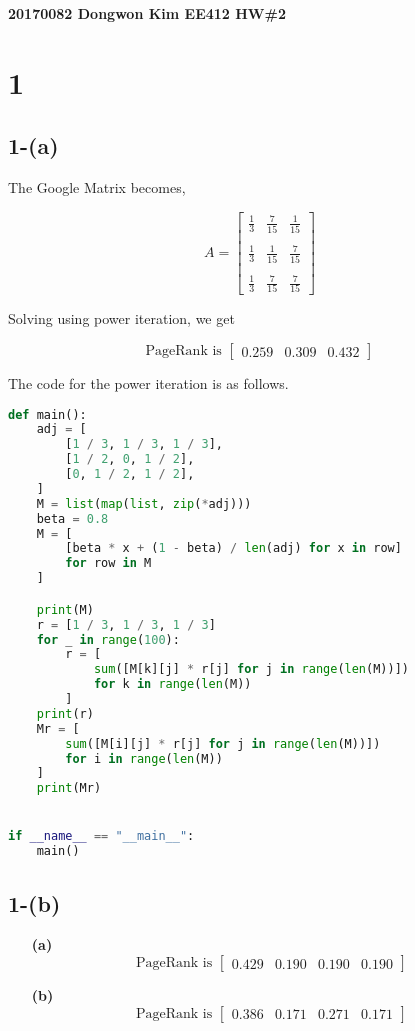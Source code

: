 \documentclass{article}
\begin{document}
\noindent
\textbf{20170082 Dongwon Kim EE412 HW\#2}\\

\noindent
\section*{1}
\subsection*{1-(a)}

The Google Matrix becomes,

\[
A = \begin{bmatrix}
    \frac{1}{3} & \frac{7}{15} & \frac{1}{15} \\ \\
    \frac{1}{3} & \frac{1}{15} & \frac{7}{15} \\ \\
    \frac{1}{3} & \frac{7}{15} & \frac{7}{15}          
\end{bmatrix}
\]

\noindent
Solving using power iteration, we get

\[
\text{PageRank is } \begin{bmatrix} 0.259 & 0.309 & 0.432 \end{bmatrix}
\]

\noindent
The code for the power iteration is as follows.

\begin{lstlisting}[language=Python]
def main():
    adj = [
        [1 / 3, 1 / 3, 1 / 3],
        [1 / 2, 0, 1 / 2],
        [0, 1 / 2, 1 / 2],
    ]
    M = list(map(list, zip(*adj)))
    beta = 0.8
    M = [
        [beta * x + (1 - beta) / len(adj) for x in row]
        for row in M
    ]

    print(M)
    r = [1 / 3, 1 / 3, 1 / 3]
    for _ in range(100):
        r = [
            sum([M[k][j] * r[j] for j in range(len(M))])
            for k in range(len(M))
        ]
    print(r)
    Mr = [
        sum([M[i][j] * r[j] for j in range(len(M))])
        for i in range(len(M))
    ]
    print(Mr)


if __name__ == "__main__":
    main()
\end{lstlisting}


\subsection*{1-(b)}
\begin{enumerate}
    \item [\textbf{(a)}] \[
        \text{PageRank is } \begin{bmatrix} 0.429 & 0.190 & 0.190 & 0.190 \end{bmatrix}
        \]
    \item[\textbf{(b)}] \[
        \text{PageRank is } \begin{bmatrix} 0.386 & 0.171 & 0.271 & 0.171 \end{bmatrix}
        \]
\end{enumerate}
\end{document}
